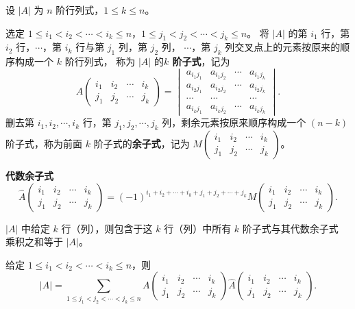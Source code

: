 \begin{definition}[$k$ 阶子式]
设 $|A|$ 为 $n$ 阶行列式，$1\le k\le n$。

选定 $1\le i_1<i_2<\cdots<i_k\le n$，$1\le j_1<j_2<\cdots<j_k\le n$。
将 $|A|$ 的第 $i_1$ 行，第 $i_2$ 行，$\cdots$，第 $i_k$ 行与第 $j_1$ 列，第 $j_2$ 列，
$\cdots$，第 $j_k$ 列交叉点上的元素按原来的顺序构成一个 $k$ 阶行列式，
称为 $|A|$ 的\textbf{$k$ 阶子式}，记为
\[
A\begin{pmatrix}i_1&i_2&\cdots&i_k\\j_1&j_2&\cdots&j_k\end{pmatrix}
=\begin{vmatrix}
a_{i_1j_1}&a_{i_1j_2}&\cdots&a_{i_1j_k}\\
a_{i_2j_1}&a_{i_2j_2}&\cdots&a_{i_2j_k}\\
\cdots&\cdots&&\cdots\\
a_{i_kj_1}&a_{i_kj_2}&\cdots&a_{i_kj_k}
\end{vmatrix}.
\]
删去第 $i_1,i_2,\cdots,i_k$ 行，第 $j_1,j_2,\cdots,j_k$ 列，剩余元素按原来顺序构成一个
$(n-k)$ 阶子式，称为前面 $k$ 阶子式的\textbf{余子式}，记为
$M\begin{pmatrix}i_1&i_2&\cdots&i_k\\j_1&j_2&\cdots&j_k\end{pmatrix}$。

\textbf{代数余子式}
\[
\hat{A}\begin{pmatrix}i_1&i_2&\cdots&i_k\\j_1&j_2&\cdots&j_k\end{pmatrix}
=(-1)^{i_1+i_2+\cdots+i_k+j_1+j_2+\cdots+j_k}
M\begin{pmatrix}i_1&i_2&\cdots&i_k\\j_1&j_2&\cdots&j_k\end{pmatrix}.
\]
\end{definition}

\begin{theorem}[Laplace 定理]
$|A|$ 中给定 $k$ 行（列），则包含于这 $k$ 行（列）中所有 $k$ 阶子式与其代数余子式
乘积之和等于 $|A|$。

给定 $1\le i_1<i_2<\cdots<i_k\le n$，则
\begin{equation}
|A|=\sum_{1\le j_1<j_2<\cdots<j_k\le n}
A\begin{pmatrix}i_1&i_2&\cdots&i_k\\j_1&j_2&\cdots&j_k\end{pmatrix}
\hat{A}\begin{pmatrix}i_1&i_2&\cdots&i_k\\j_1&j_2&\cdots&j_k\end{pmatrix}.
\tag{$\star$}
\end{equation}
\end{theorem}

